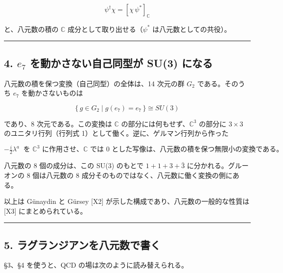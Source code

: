 \documentclass[
  a4paper,
]{ltjsarticle}
\begin{document}
\[
\psi^\dagger\chi = \left[\chi\,\psi^*\right]_{\mathbb C} \tag{3.4}
\]

と、八元数の積の \(\mathbb{C}\) 成分として取り出せる（\(\psi^*\)
は八元数としての共役）。

\begin{center}\rule{0.5\linewidth}{0.5pt}\end{center}

\subsection{\texorpdfstring{4. \(e_7\) を動かさない自己同型が SU(3)
になる}{4. e\_7 を動かさない自己同型が SU(3) になる}}\label{e_7-ux3092ux52d5ux304bux3055ux306aux3044ux81eaux5df1ux540cux578bux304c-su3-ux306bux306aux308b}

八元数の積を保つ変換（自己同型）の全体は、14 次元の群 \(G_2\)
である。そのうち \(e_7\) を動かさないものは

\[
\{\,g \in G_2 \mid g(e_7) = e_7\,\} \cong SU(3) \tag{4.1}
\]

であり、8 次元である。この変換は \(\mathbb{C}\)
の部分には何もせず、\(\mathbb{C}^3\) の部分に \(3\times3\)
のユニタリ行列（行列式 1）として働く。逆に、ゲルマン行列から作った

\[
-\tfrac{i}{2}\lambda^a \ \text{ を } \mathbb{C}^3 \text{ に作用させ、} \mathbb{C} \text{ では } 0 \text{ とした写像は、八元数の積を保つ無限小の変換である。} \tag{4.2}
\]

八元数の 8 個の成分は、この SU(3) のもとで \(1 + 1 + 3 + \bar 3\)
に分かれる。グルーオンの 8 個は八元数の 8
成分そのものではなく、八元数に働く変換の側にある。

以上は Günaydin と Gürsey {[}X2{]}
が示した構成であり、八元数の一般的な性質は {[}X3{]} にまとめられている。

\begin{center}\rule{0.5\linewidth}{0.5pt}\end{center}

\subsection{5.
ラグランジアンを八元数で書く}\label{ux30e9ux30b0ux30e9ux30f3ux30b8ux30a2ux30f3ux3092ux516bux5143ux6570ux3067ux66f8ux304f}

§3、§4 を使うと、QCD の場は次のように読み替えられる。
\end{document}
